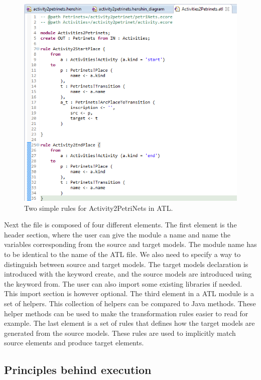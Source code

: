 \begin{figure}[H]
	\centering
	\includegraphics[scale=0.5]{figures/ATLScreen.png}
	\caption{Two simple rules for Activity2PetriNets in ATL.}
	\label{fig:ATL_Screen}
\end{figure}

Next the
file is composed of four different elements. The first element is the header
section, where the user can give the module a name and name the variables
corresponding from the source and target models. The module name has to be
identical to the name of the ATL file. We also need to specify a way to
distinguish between source and target models. The target models declaration is
introduced with the keyword create, and the source models are introduced using
the keyword from. The user can also import some existing libraries if needed.
This import section is however optional. The third element in a ATL module is a
set of helpers. This collection of helpers can be compared to Java methods.
These helper methods can be used to make the transformation rules easier to read
for example. The last element is a set of rules that defines how the target
models are generated from the source models. These rules are used to implicitly
match source elements and produce target elements. 

\subsection{Principles behind execution}

